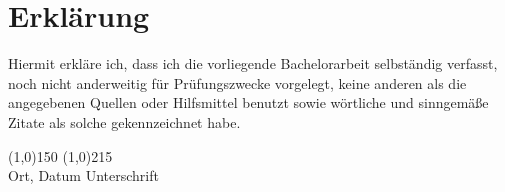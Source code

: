 
\chapter*{Erklärung}
Hiermit erkläre ich, dass ich die vorliegende Bachelorarbeit selbständig verfasst, noch nicht anderweitig für Prüfungszwecke vorgelegt, keine anderen als die angegebenen Quellen oder Hilfsmittel benutzt sowie wörtliche und sinngemäße Zitate als solche gekennzeichnet habe.
\vspace{3cm}

\line(1,0){150} \hspace{20mm} \line(1,0){215}\\
Ort, Datum \hspace{5cm} Unterschrift
